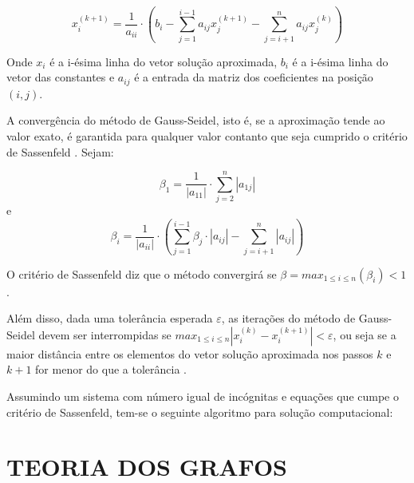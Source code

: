 \documentclass[twocolumn, 10pt]{extarticle}
\begin{document}
\[
x_{i}^{(k+1)} = \frac{1}{a_{ii}}\cdot \left(b_i - \sum_{j=1}^{i-1}a_{ij}x_{j}^{(k+1)} - \sum_{j=i+1}^{n}a_{ij}x_{j}^{(k)} \right)
\]

Onde $x_i$ é a i-ésima linha do vetor solução aproximada, $b_i$ é a i-ésima linha do vetor das constantes e $a_{ij}$ é a entrada da matriz dos coeficientes na posição $(i,j)$.

A convergência do método de Gauss-Seidel, isto é, se a aproximação tende ao valor exato, é garantida para qualquer valor contanto que seja cumprido o critério de Sassenfeld \cite[p. 171]{ruggiero}. Sejam:

\[
\beta_1 = \frac{1}{|a_{11}|} \cdot \sum_{j=2}^{n} |a_{1j}|
\]
e
\[
\beta_i = \frac{1}{|a_{ii}|} \cdot \left(\sum_{j=1}^{i-1} \beta_j\cdot |a_{ij}| - \sum_{j=i+1}^{n} |a_{ij}|\right)
\]

O critério de Sassenfeld diz que o método convergirá se $\beta = max_{1 \leq i \leq n} (\beta_i) < 1$ \cite[p. 173]{ruggiero}.

Além disso, dada uma tolerância esperada $\varepsilon$, as iterações do método de Gauss-Seidel devem ser interrompidas se $max_{1 \leq i \leq n} |x^{(k)}_i-x^{(k+1)}_i| < \varepsilon$, ou seja se a maior distância entre os elementos do vetor solução aproximada nos passos $k$ e $k+1$ for menor do que a tolerância \cite[p. 155]{ruggiero}.

Assumindo um sistema com número igual de incógnitas e equações que cumpe o critério de Sassenfeld, tem-se o seguinte algoritmo para solução computacional:

\begingroup
{}\label{gs}
\begin{algorithmic}[1]
			\EndFor
			\EndFor
		\EndFor
		\EndIf
	\EndFor
\EndFunction
\end{algorithmic}
\hrulefill
\endgroup

\section{TEORIA DOS GRAFOS}
\end{document}
